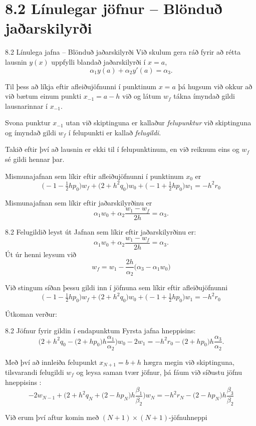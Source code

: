\section*{8.2 Línulegar jöfnur -- Blönduð jaðarskilyrði}
\begin{frame}{8.2 Línulega jafna -- Blönduð jaðarskilyrði} 
Við skulum gera ráð fyrir að rétta lausnin $y(x)$ uppfylli blandað
jaðarskilyrði í $x=a$, 
$$
\alpha_1y(a)+\alpha_2 y'(a)=\alpha_3.
$$

\pause
Til þess að líkja eftir afleiðujöfnunni í punktinum $x=a$ þá hugsum
við okkur að við bætum einum punkti $x_{-1}=a-h$ við og látum 
$w_f$ tákna ímyndað gildi lausnarinnar í $x_{-1}$.  

\pause
\smallskip
Svona punktur $x_{-1}$ utan við skiptinguna er kallaður 
{\it felupunktur} við skiptinguna og ímyndað gildi $w_f$ í 
felupunkti er kallað  {\it felugildi}.   \pause

\smallskip
Takið eftir því að lausnin er ekki til í felupunktinum, en við reiknum
eins og $w_f$ sé gildi hennar þar. 

\pause
\smallskip
Mismunajafnan sem líkir eftir afleiðujöfnunni í punktinum $x_0$  er 
$$
\big(-1-\tfrac 12 hp_0\big)w_f+\big(2+h^2 q_0\big)w_0
+\big(-1+\tfrac 12 hp_0\big)w_1=-h^2r_0
$$

\pause
Mismunajafnan sem líkir eftir jaðarskilyrðinu er
$$
\alpha_1w_0+\alpha_2 \dfrac{w_1-w_f}{2h}=\alpha_3.
$$
\end{frame}


\begin{frame}{8.2 Felugildið leyst út} 
Jafnan sem líkir eftir jaðarskilyrðinu er:
$$
\alpha_1w_0+\alpha_2 \dfrac{w_1-w_f}{2h}=\alpha_3.
$$
Út úr henni leysum við
$$
w_f=w_1-\dfrac{2h}{\alpha_2}\big(\alpha_3-\alpha_1w_0\big)
$$

\pause
Við stingum síðan þessu gildi inn í jöfnuna sem líkir eftir
afleiðujöfnunni 
$$
\big(-1-\tfrac 12 hp_0\big)w_f+\big(2+h^2 q_0\big)w_0
+\big(-1+\tfrac 12 hp_0\big)w_1=-h^2r_0
$$

\pause
Útkoman verður:
\end{frame}


\begin{frame}{8.2 Jöfnur fyrir gildin í endapunktum} 
Fyrsta jafna hneppisins:
$$
\bigg(2+h^2q_0-\big(2+hp_0\big)h\dfrac{\alpha_1}{\alpha_2}\bigg)w_0
-2w_1=-h^2r_0-\big(2+hp_0\big)h\dfrac{\alpha_3}{\alpha_2}.
$$

\pause
\smallskip
Með því að innleiða felupunkt  $x_{N+1}=b+h$ hægra megin við 
skiptinguna, tilsvarandi
felugildi $w_f$ og leysa saman tvær jöfnur, þá fáum við síðustu jöfnu
hneppisins :
$$
-2w_{N-1}
+\bigg(2+h^2q_N+\big(2-hp_N\big)h\dfrac{\beta_1}{\beta_2}\bigg)w_N
=-h^2r_N-\big(2-hp_N\big)h\dfrac{\beta_3}{\beta_2}
$$

\pause
\smallskip
Við erum því aftur komin með $(N+1)\times (N+1)$-jöfnuhneppi
\end{frame}


